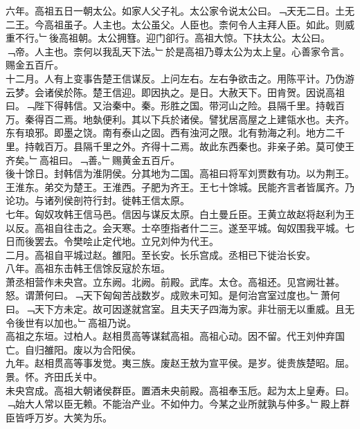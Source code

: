 \documentclass{zhvt-classic}
\begin{document}
\hspace*{2em}六年。高祖五日一朝太公。如家人父子礼。太公家令说太公曰。﹁天无二日。土无二王。今高祖虽子。人主也。太公虽父。人臣也。柰何令人主拜人臣。如此。则威重不行。﹂後高祖朝。太公拥篲。迎门卻行。高祖大惊。下扶太公。太公曰。﹁帝。人主也。柰何以我乱天下法。﹂於是高祖乃尊太公为太上皇。心善家令言。赐金五百斤。\\
\hspace*{2em}十二月。人有上变事告楚王信谋反。上问左右。左右争欲击之。用陈平计。乃伪游云梦。会诸侯於陈。楚王信迎。即因执之。是日。大赦天下。田肯贺。因说高祖曰。﹁陛下得韩信。又治秦中。秦。形胜之国。带河山之险。县隔千里。持戟百万。秦得百二焉。地埶便利。其以下兵於诸侯。譬犹居高屋之上建瓴水也。夫齐。东有琅邪。即墨之饶。南有泰山之固。西有浊河之限。北有勃海之利。地方二千里。持戟百万。县隔千里之外。齐得十二焉。故此东西秦也。非亲子弟。莫可使王齐矣。﹂高祖曰。﹁善。﹂赐黄金五百斤。\\
\hspace*{2em}後十馀日。封韩信为淮阴侯。分其地为二国。高祖曰将军刘贾数有功。以为荆王。王淮东。弟交为楚王。王淮西。子肥为齐王。王七十馀城。民能齐言者皆属齐。乃论功。与诸列侯剖符行封。徙韩王信太原。\\
\hspace*{2em}七年。匈奴攻韩王信马邑。信因与谋反太原。白土曼丘臣。王黄立故赵将赵利为王以反。高祖自往击之。会天寒。士卒堕指者什二三。遂至平城。匈奴围我平城。七日而後罢去。令樊哙止定代地。立兄刘仲为代王。\\
\hspace*{2em}二月。高祖自平城过赵。雒阳。至长安。长乐宫成。丞相已下徙治长安。\\
\hspace*{2em}八年。高祖东击韩王信馀反寇於东垣。\\
\hspace*{2em}萧丞相营作未央宫。立东阙。北阙。前殿。武库。太仓。高祖还。见宫阙壮甚。怒。谓萧何曰。﹁天下匈匈苦战数岁。成败未可知。是何治宫室过度也。﹂萧何曰。﹁天下方未定。故可因遂就宫室。且夫天子四海为家。非壮丽无以重威。且无令後世有以加也。﹂高祖乃说。\\
\hspace*{2em}高祖之东垣。过柏人。赵相贯高等谋弑高祖。高祖心动。因不留。代王刘仲弃国亡。自归雒阳。废以为合阳侯。\\
\hspace*{2em}九年。赵相贯高等事发觉。夷三族。废赵王敖为宣平侯。是岁。徙贵族楚昭。屈。景。怀。齐田氏关中。\\
\hspace*{2em}未央宫成。高祖大朝诸侯群臣。置酒未央前殿。高祖奉玉卮。起为太上皇寿。曰。﹁始大人常以臣无赖。不能治产业。不如仲力。今某之业所就孰与仲多。﹂殿上群臣皆呼万岁。大笑为乐。\\
\end{document}
